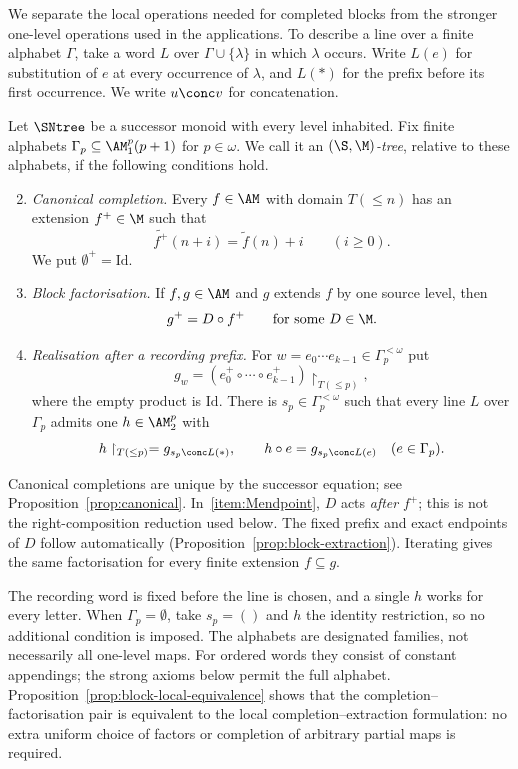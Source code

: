 We separate the local operations needed for completed blocks from the
stronger one-level operations used in the applications. To describe a
line over a finite alphabet $\Gamma$, take a word $L$ over
$\Gamma\cup\{\lambda\}$ in which $\lambda$ occurs. Write $L(e)$ for
substitution of $e$ at every occurrence of $\lambda$, and $L(*)$ for
the prefix before its first occurrence. We write $u\conc v$ for
concatenation.

\begin{definition}[$(\S,\M)$-tree]\label{def:block-monoid}
Let $\SNtree$ be a successor monoid with every level inhabited.
Fix finite alphabets $\Gamma_p\subseteq\AM^p_1(p+1)$ for $p\in\omega$.
We call it an \emph{$(\S,\M)$-tree}, relative to these alphabets,
if the following conditions hold.
\begin{enumerate}[label=(M\arabic*)]
\setcounter{enumi}{1}
\item\label{item:Mcompletion}\emph{Canonical completion.}
Every $f\in\AM$ with domain $T({\leq}n)$ has an extension $f^+\in\M$ such that
$$
 \widetilde{f^+}(n+i)=\widetilde f(n)+i\qquad(i\geq0).
$$
We put $\emptyset^+=\mathrm{Id}$.

\item\label{item:Mendpoint}\emph{Block factorisation.}
If $f,g\in\AM$ and $g$ extends $f$ by one source level, then
$$
 g^+=D\circ f^+\qquad\text{for some }D\in\M.
$$

\item\label{item:Mseeded}\emph{Realisation after a recording prefix.}
For $w=e_0\cdots e_{k-1}\in\Gamma_p^{<\omega}$ put
$$
 g_w=(e_0^+\circ\cdots\circ e_{k-1}^+)
           \restriction_{T({\leq}p)},
$$
where the empty product is $\mathrm{Id}$.
There is $s_p\in\Gamma_p^{<\omega}$ such that every line $L$ over
$\Gamma_p$ admits one $h\in\AM^p_2$ with
$$
 h\restriction_{T({\leq}p)}=g_{s_p\conc L(*)},\qquad
 h\circ e=g_{s_p\conc L(e)}\quad(e\in\Gamma_p).
$$
\end{enumerate}
\end{definition}
Canonical completions are unique by the successor equation; see
Proposition~\ref{prop:canonical}. In~\ref{item:Mendpoint}, $D$ acts
\emph{after} $f^+$; this is not the right-composition reduction used
below. The fixed prefix and exact endpoints of $D$ follow automatically
(Proposition~\ref{prop:block-extraction}). Iterating gives the same
factorisation for every finite extension $f\subseteq g$.

The recording word is fixed before the line is chosen, and a single
$h$ works for every letter. When $\Gamma_p=\emptyset$, take $s_p=()$
and $h$ the identity restriction, so no additional condition is imposed.
The alphabets are designated families, not necessarily all one-level
maps. For ordered words they consist of constant appendings; the strong
axioms below permit the full alphabet. Proposition~\ref{prop:block-local-equivalence}
shows that the completion--factorisation pair is equivalent to the
local completion--extraction formulation: no extra uniform choice of
factors or completion of arbitrary partial maps is required.

